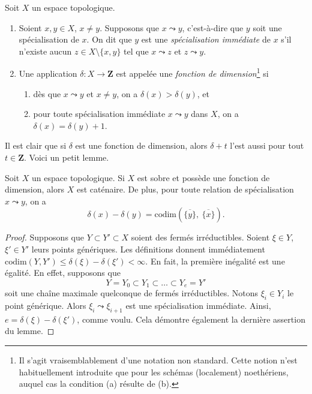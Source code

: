 \begin{definition}
\label{definition-dimension-function}
Soit $X$ un espace topologique.
\begin{enumerate}
\item Soient $x, y \in X$, $x \not = y$. Supposons que $x \leadsto y$,
c'est-à-dire que $y$ soit une spécialisation de $x$.
On dit que $y$ est une {\it spécialisation immédiate}
de $x$ s'il n'existe aucun
$z \in X \setminus \{x, y\}$ tel que $x \leadsto z$ et $z \leadsto y$.
\item Une application $\delta : X \to \mathbf{Z}$ est appelée une
{\it fonction de dimension}\footnote{Il s'agit vraisemblablement d'une
notation non standard. Cette notion n'est habituellement introduite que
pour les schémas (localement) noethériens, auquel cas la condition (a) résulte
de (b).} si
\begin{enumerate}
\item dès que $x \leadsto y$ et $x \not = y$,
on a $\delta(x) > \delta(y)$, et
\item pour toute spécialisation immédiate $x \leadsto y$ dans $X$,
on a $\delta(x) = \delta(y) + 1$.
\end{enumerate}
\end{enumerate}
\end{definition}

\noindent
Il est clair que si $\delta$ est une fonction de dimension, alors
$\delta + t$ l'est aussi pour tout $t \in \mathbf{Z}$. Voici un petit lemme.

\begin{lemma}
\label{lemma-dimension-function-catenary}
Soit $X$ un espace topologique. Si $X$ est sobre et possède une fonction de
dimension, alors $X$ est caténaire. De plus, pour toute relation de
spécialisation $x \leadsto y$,
on a
$$
\delta(x) - \delta(y) =
\text{codim}\left(\overline{\{y\}}, \ \overline{\{x\}}\right).
$$
\end{lemma}

\begin{proof}
Supposons que $Y \subset Y' \subset X$ soient des fermés irréductibles.
Soient $\xi \in Y$, $\xi' \in Y'$ leurs points génériques.
Les définitions donnent immédiatement
$\text{codim}(Y, Y') \leq \delta(\xi) - \delta(\xi') < \infty$.
En fait, la première inégalité est une égalité. En effet, supposons que
$$
Y = Y_0 \subset Y_1 \subset \ldots \subset Y_e = Y'
$$
soit une chaîne maximale quelconque de fermés irréductibles. Notons
$\xi_i \in Y_i$ le point générique. Alors
$\xi_i \leadsto \xi_{i + 1}$ est une spécialisation immédiate.
Ainsi, $e = \delta(\xi) - \delta(\xi')$, comme voulu.
Cela démontre également la dernière assertion du lemme.
\end{proof}

